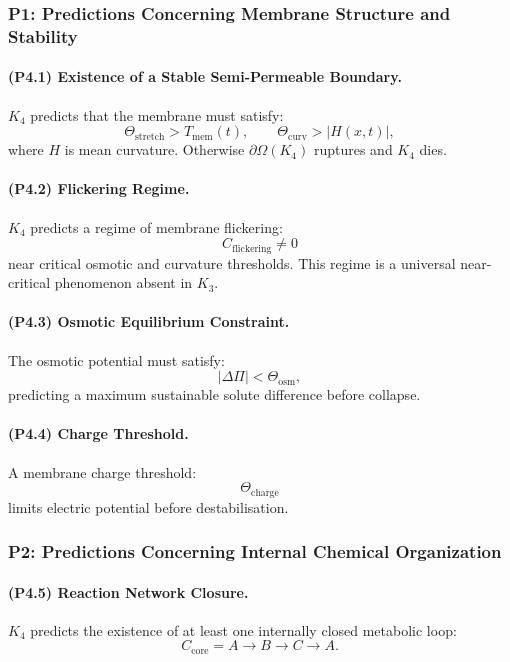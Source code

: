 \subsubsection{P1: Predictions Concerning Membrane Structure and Stability}

\paragraph{(P4.1) Existence of a Stable Semi-Permeable Boundary.}
$K_4$ predicts that the membrane must satisfy:
\[
\Theta_{\mathrm{stretch}} > T_{\mathrm{mem}}(t), \qquad
\Theta_{\mathrm{curv}} > |H(x,t)|,
\]
where $H$ is mean curvature.  
Otherwise $\partial\Omega(K_4)$ ruptures and $K_4$ dies.

\paragraph{(P4.2) Flickering Regime.}
$K_4$ predicts a regime of membrane flickering:
\[
C_{\mathrm{flickering}} \neq 0
\]
near critical osmotic and curvature thresholds.  
This regime is a universal near-critical phenomenon absent in $K_3$.

\paragraph{(P4.3) Osmotic Equilibrium Constraint.}
The osmotic potential must satisfy:
\[
|\Delta \Pi| < \Theta_{\mathrm{osm}},
\]
predicting a maximum sustainable solute difference before collapse.

\paragraph{(P4.4) Charge Threshold.}
A membrane charge threshold:
\[
\Theta_{\mathrm{charge}}
\]
limits electric potential before destabilisation.

\subsubsection{P2: Predictions Concerning Internal Chemical Organization}

\paragraph{(P4.5) Reaction Network Closure.}
$K_4$ predicts the existence of at least one internally closed metabolic loop:
\[
C_{\mathrm{core}} = A \to B \to C \to A.
\]

